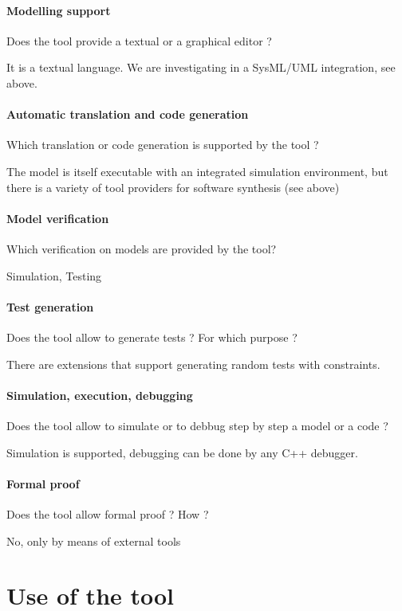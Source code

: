 \paragraph{Modelling support}
Does the tool provide a textual or a graphical editor ?

It is a textual language. We are investigating in a SysML/UML integration, see above.

\paragraph{Automatic translation and code generation}
Which translation or code generation is supported by the tool ?

The model is itself executable with an integrated simulation environment, but there is a variety of tool providers for software synthesis (see above)

\paragraph{Model verification}
Which verification on models are provided by the tool?

Simulation, Testing

\paragraph{Test generation}
Does the tool allow to generate tests ? For which purpose ?

There are extensions that support generating random tests with constraints.

\paragraph{Simulation, execution, debugging}
Does the tool allow to simulate or to debbug step by step a model or a code ?

Simulation is supported, debugging can be done by any C++ debugger.

\paragraph{Formal proof}
Does the tool allow formal proof ? How ?

No, only by means of external tools


\section{Use of the tool}


